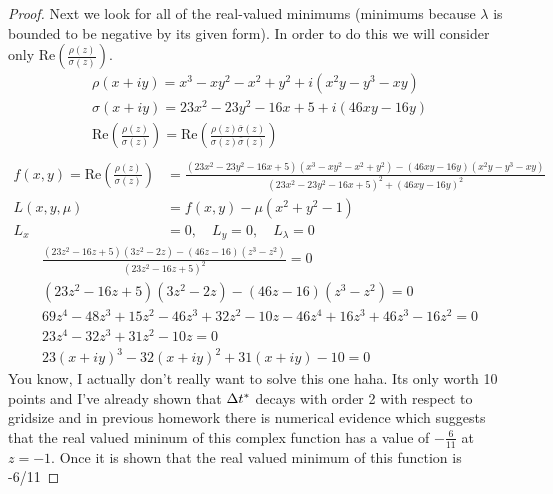 \documentclass{article}
\begin{document}
\begin{enumerate}[label=\alph*)]
\begin{proof}
            Next we look for all of the real-valued minimums (minimums because
            $\lambda$ is bounded to be negative by its given form). In order to
            do this we will consider only Re$\left(\frac{\rho(z)}{\sigma(z)}\right)$. 
            \begin{align*}
                \rho(x+iy) = x^3 - xy^2 - x^2 + y^2 + i(x^2y - y^3 -xy)\\
                \sigma(x+iy) = 23x^2 - 23y^2 - 16x + 5 + i\left(46xy -
                16y\right)\\
                \text{Re}\left(\frac{\rho(z)}{\sigma(z)}\right) =
                \text{Re}\left(\frac{\rho(z)\bar{\sigma}(z)}{\sigma(z)\bar{\sigma}(z)}\right)\\
            \end{align*}
            \begin{align*}
                f(x,y) = \text{Re}\left(\frac{\rho(z)}{\sigma(z)}\right) &= \frac{(23x^2 -
                23y^2 - 16x + 5)(x^3 - xy^2 - x^2 + y^2) - \left(46xy -  16y\right)\left(x^2y - y^3 -xy\right)}
                {(23x^2 - 23y^2 - 16x + 5)^2 + \left(46xy - 16y\right)^2}\\
                L(x,y,\mu) &= f(x,y) - \mu(x^2 + y^2 - 1)\\
                L_x &= 0, \quad L_y = 0, \quad L_{\lambda} = 0
            \end{align*}
            \begin{align*}
                \frac{(23z^2-16z+5)(3z^2 - 2z) - (46z - 16)(z^3 - z^2)}{(23z^2 - 16z +
                5)^2 } = 0\\
                (23z^2-16z+5)(3z^2 - 2z) - (46z - 16)(z^3 - z^2) = 0\\
                69z^4 - 48z^3 + 15z^2 - 46z^3 +32z^2 - 10z - 46z^4 + 16z^3 +
                46z^3 - 16z^2 = 0\\
                23z^4 - 32 z^3 + 31z^2 - 10z = 0\\
                23(x+iy)^3 - 32(x+iy)^2 + 31(x+iy) - 10 = 0
            \end{align*}
            You know, I actually don't really want to solve this one haha. Its
            only worth 10 points and I've already shown that $\Delta t^*$ decays with
            order 2 with respect to gridsize and in previous homework there is
            numerical evidence which suggests that the real valued mininum of
            this complex function has a value of $-\frac{6}{11}$ at $z=-1$. Once it is
            shown that the real valued minimum of this function is -6/11

\end{proof}
\end{enumerate}
\end{document}
